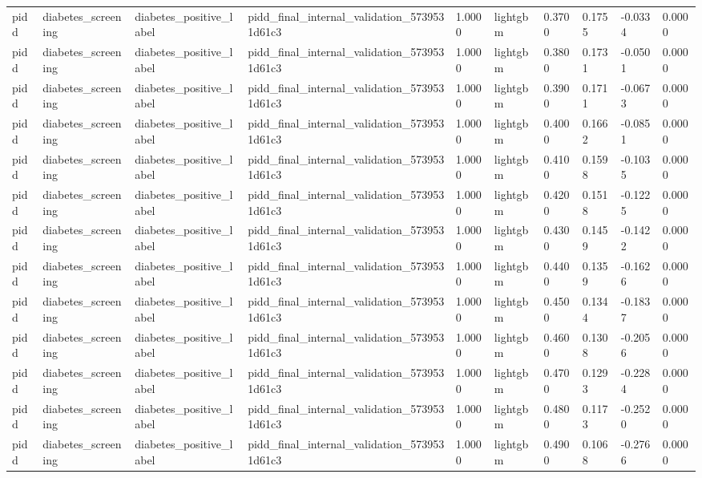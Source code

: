 \begin{tabular}{llllllllll}
pidd & diabetes\_screening & diabetes\_positive\_label & pidd\_final\_internal\_validation\_5739531d61c3 & 1.0000 & lightgbm & 0.3700 & 0.1755 & -0.0334 & 0.0000 \\
pidd & diabetes\_screening & diabetes\_positive\_label & pidd\_final\_internal\_validation\_5739531d61c3 & 1.0000 & lightgbm & 0.3800 & 0.1731 & -0.0501 & 0.0000 \\
pidd & diabetes\_screening & diabetes\_positive\_label & pidd\_final\_internal\_validation\_5739531d61c3 & 1.0000 & lightgbm & 0.3900 & 0.1711 & -0.0673 & 0.0000 \\
pidd & diabetes\_screening & diabetes\_positive\_label & pidd\_final\_internal\_validation\_5739531d61c3 & 1.0000 & lightgbm & 0.4000 & 0.1662 & -0.0851 & 0.0000 \\
pidd & diabetes\_screening & diabetes\_positive\_label & pidd\_final\_internal\_validation\_5739531d61c3 & 1.0000 & lightgbm & 0.4100 & 0.1598 & -0.1035 & 0.0000 \\
pidd & diabetes\_screening & diabetes\_positive\_label & pidd\_final\_internal\_validation\_5739531d61c3 & 1.0000 & lightgbm & 0.4200 & 0.1518 & -0.1225 & 0.0000 \\
pidd & diabetes\_screening & diabetes\_positive\_label & pidd\_final\_internal\_validation\_5739531d61c3 & 1.0000 & lightgbm & 0.4300 & 0.1459 & -0.1422 & 0.0000 \\
pidd & diabetes\_screening & diabetes\_positive\_label & pidd\_final\_internal\_validation\_5739531d61c3 & 1.0000 & lightgbm & 0.4400 & 0.1359 & -0.1626 & 0.0000 \\
pidd & diabetes\_screening & diabetes\_positive\_label & pidd\_final\_internal\_validation\_5739531d61c3 & 1.0000 & lightgbm & 0.4500 & 0.1344 & -0.1837 & 0.0000 \\
pidd & diabetes\_screening & diabetes\_positive\_label & pidd\_final\_internal\_validation\_5739531d61c3 & 1.0000 & lightgbm & 0.4600 & 0.1308 & -0.2056 & 0.0000 \\
pidd & diabetes\_screening & diabetes\_positive\_label & pidd\_final\_internal\_validation\_5739531d61c3 & 1.0000 & lightgbm & 0.4700 & 0.1293 & -0.2284 & 0.0000 \\
pidd & diabetes\_screening & diabetes\_positive\_label & pidd\_final\_internal\_validation\_5739531d61c3 & 1.0000 & lightgbm & 0.4800 & 0.1173 & -0.2520 & 0.0000 \\
pidd & diabetes\_screening & diabetes\_positive\_label & pidd\_final\_internal\_validation\_5739531d61c3 & 1.0000 & lightgbm & 0.4900 & 0.1068 & -0.2766 & 0.0000 \\

\end{tabular}
